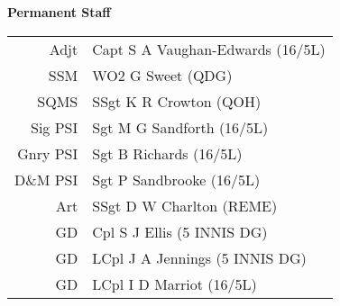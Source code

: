 \vspace*{10mm}

\begin{center}
  \Large
  \textbf{Permanent Staff}
\end{center}

\begin{center}
  \begin{tabular}{rl}
    Adjt & Capt S A Vaughan-Edwards (16/5L) \\
    SSM & WO2 G Sweet (QDG) \\
    SQMS & SSgt K R Crowton (QOH) \\
    Sig PSI & Sgt M G Sandforth (16/5L) \\
    Gnry PSI & Sgt B Richards (16/5L) \\
    D\&M PSI & Sgt P Sandbrooke (16/5L) \\
    Art & SSgt D W Charlton (REME) \\
    GD & Cpl S J Ellis (5 INNIS DG) \\
    GD & LCpl J A Jennings (5 INNIS DG) \\
    GD & LCpl I D Marriot (16/5L) \\
  \end{tabular}
\end{center}
